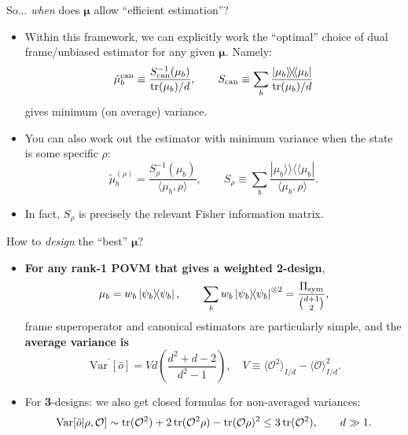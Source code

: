 \documentclass{beamer}
\begin{document}
\begin{frame}{So... \textit{when} does $\boldsymbol\mu$ allow ``efficient estimation''?}
    \begin{itemize}
        \item Within this framework, we can explicitly work the ``optimal'' choice of dual frame/unbiased estimator for any given $\boldsymbol\mu$. Namely:
        \begin{equation*}
            \tilde\mu_b^{\rm can} \equiv \frac{ S^{-1}_{\rm can}(\mu_b)}{\trace(\mu_b)/d},
            \qquad
            S_{\rm can} \equiv \sum_b \frac{|\mu_b\rangle\!\rangle\!\langle\!\langle\mu_b|}{\trace(\mu_b)/d}
        \end{equation*}
        gives minimum (on average) variance.
        \pause
        \item You can also work out the estimator with minimum variance when the state is some specific $\rho$:
        \begin{equation*}
            \tilde\mu_b^{(\rho)} = \frac{S^{-1}_\rho(\mu_b)}{\langle\mu_b,\rho\rangle},
            \qquad
            S_\rho \equiv \sum_b \frac{|\mu_b\rangle\!\rangle\!\langle\!\langle\mu_b|}{\langle \mu_b,\rho \rangle }.
        \end{equation*}
        \item \colorbox{yellow!20}{In fact, $S_\rho$ is precisely the relevant Fisher information matrix.}
    \end{itemize}
\end{frame}

\begin{frame}{How to \textit{design} the ``best'' $\boldsymbol\mu$?}
    \begin{itemize}
        \item \textbf{For any rank-1 POVM that gives a weighted 2-design}, 
        \begin{equation*}
            \mu_b = w_b \ketbra{\psi_b},
            \qquad
            \sum_b w_b \ketbra{\psi_b}^{\otimes 2}
            = \frac{\Pi_{\rm sym} }{\binom{d+1}{2}},
        \end{equation*}
        frame superoperator and canonical estimators are particularly simple, and the \textbf{average variance is}
        \begin{equation*}
            \overline{\operatorname{Var}[\hat o]} =
            Vd \left(\frac{d^2+d-2}{d^2-1}\right),
            \quad
            V \equiv \langle\mathcal O^2\rangle_{I/d}
            -\langle \mathcal O\rangle_{I/d}^2.
        \end{equation*}
        \item For \textbf{3}-designs: we also get closed formulas for non-averaged variances:
        \begin{equation*}
            \operatorname{Var}[\hat o|\rho,\mathcal O]
            \sim \trace(\mathcal O^2) + 2\trace(\mathcal O^2\rho)
            - \trace(\mathcal O\rho)^2
            \le 3 \trace(\mathcal O^2),
            \qquad d\gg1.
        \end{equation*}
    \end{itemize}
\end{frame}
\end{document}

